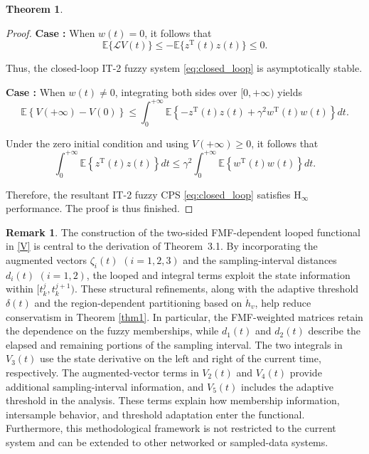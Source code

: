 \documentclass[preprint,review,fleqn,sort&compress,3p]{elsarticle}
\theoremstyle{definition} %
\theoremstyle{definition}%
\newtheorem{thm}{Theorem}[section]
\newtheorem{rem}{Remark}[section]
\begin{document}
\begin{thm}
\begin{proof}
\textbf{Case \uppercase\expandafter{}:} When $w(t)=0$, it follows that
\begin{equation}
	\mathbb{E}\{\mathcal{L}V(t)\}
	\leq
	-\mathbb{E}\{z^{\mathrm{T}}(t)z(t)\}
	\leq 0.
\end{equation}

Thus, the closed-loop IT-2 fuzzy system \eqref{eq:closed_loop} is asymptotically stable.

\textbf{Case \uppercase\expandafter{}:} When $w(t)\neq0$, integrating both sides over $[0,+\infty)$ yields
\begin{equation}
	\mathbb{E}\left\{V(+\infty)-V(0)\right\}
	\leq
	\int_{0}^{+\infty}
	\mathbb{E}\left\{
	-z^{\mathrm{T}}(t)z(t)
	+\gamma^2 w^{\mathrm{T}}(t)w(t)
	\right\}dt.
\end{equation}

Under the zero initial condition and using $V(+\infty)\ge0$, it follows that
\begin{equation}
	\int_{0}^{+\infty}
	\mathbb{E}\left\{
	z^{\mathrm{T}}(t)z(t)
	\right\}dt
	\leq
	\gamma^2
	\int_{0}^{+\infty}
	\mathbb{E}\left\{
	w^{\mathrm{T}}(t)w(t)
	\right\}dt.
\end{equation}

Therefore, the resultant IT-2 fuzzy CPS \eqref{eq:closed_loop} satisfies $\mathrm{H}_\infty$ performance. The proof is thus finished.
\end{proof}
\end{thm}
\begin{rem}
The construction of the two-sided FMF-dependent looped functional in \eqref{V} is central to the derivation of Theorem~3.1.
By incorporating the augmented vectors $\zeta_i(t)$ $(i=1,2,3)$ and the sampling-interval distances $d_i(t)$ $(i=1,2)$, the looped and integral terms exploit the state information within $[t_k^j,t_k^{j+1})$.
These structural refinements, along with the adaptive threshold $\delta(t)$ and the region-dependent partitioning based on $\dot{h}_v$, help reduce conservatism in Theorem \ref{thm1}.
In particular, the FMF-weighted matrices retain the dependence on the fuzzy memberships, while $d_1(t)$ and $d_2(t)$ describe the elapsed and remaining portions of the sampling interval. The two integrals in $V_3(t)$ use the state derivative on the left and right of the current time, respectively. The augmented-vector terms in $V_2(t)$ and $V_4(t)$ provide additional sampling-interval information, and $V_5(t)$ includes the adaptive threshold in the analysis. These terms explain how membership information, intersample behavior, and threshold adaptation enter the functional.
Furthermore, this methodological framework is not restricted to the current system and can be extended to other networked or sampled-data systems.
\end{rem}
\end{document}

